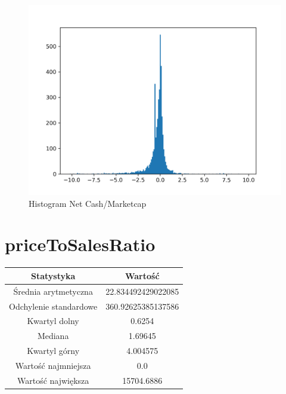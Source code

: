 \documentclass{article}
\begin{document}
\begin{figure}[h!]
    \includegraphics[width=\linewidth]{variables/Net Cash_Marketcap.png}
    \caption{Histogram Net Cash/Marketcap }
\end{figure}\section{ priceToSalesRatio }

\begin{center}
    \begin{tabular}{|c | c|} 
    \hline
    Statystyka & Wartość \\
    \hline\hline
    Średnia arytmetyczna & 22.834492429022085 \\ 
    \hline
    Odchylenie standardowe & 360.92625385137586 \\
    \hline
    Kwartyl dolny & 0.6254 \\
    \hline
    Mediana & 1.69645 \\
    \hline
    Kwartyl górny & 4.004575 \\
    \hline
    Wartość najmniejsza & 0.0 \\
    \hline
    Wartość największa & 15704.6886 \\
    \hline
   \end{tabular}
\end{center}
\end{document}
